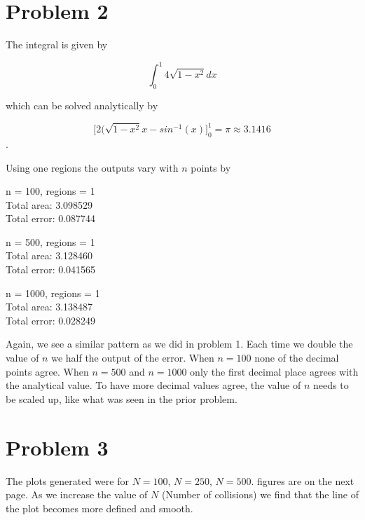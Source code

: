 \documentclass[12pt]{article}
\begin{document}
\newpage

\section*{Problem 2}

The integral is given by

$$
\int_{0}^{1} 4\sqrt{1 - x^{2}} dx
$$

which can be solved analytically by

$$
\Big[2(\sqrt{1 - x^2}x - sin^{-1}(x)  \Big]_{0}^{1} = \pi \approx 3.1416
$$.
 
Using one regions the outputs vary with $n$ points by

\begin{center}
n = 100, regions = 1 \\ 
Total area: 3.098529 \\
Total error: 0.087744 \\
\end{center}

\begin{center}
n = 500, regions = 1 \\
Total area: 3.128460 \\
Total error: 0.041565 \\
\end{center}

\begin{center}
n = 1000, regions = 1 \\
Total area: 3.138487 \\
Total error: 0.028249 \\
\end{center}

Again, we see a similar pattern as we did in problem 1. Each time we double the value of $n$ we half the output of the error. When $n = 100$ none of the decimal points agree. When $n = 500$ and $n = 1000$ only the first decimal place agrees with the analytical value. To have more decimal values agree, the value of $n$ needs to be scaled up, like what was seen in the prior problem.


\section*{Problem 3}

The plots generated were for $N = 100$, $N = 250$, $N =500$. figures are on the next page. As we increase the value of $N$ (Number of collisions) we find that the line of the plot becomes more defined and smooth.
\end{document}
